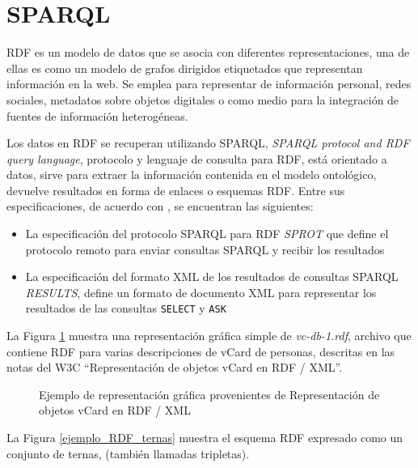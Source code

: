 \section{SPARQL}

RDF es un modelo de datos que se asocia con diferentes representaciones, una de ellas es como un modelo de grafos dirigidos etiquetados que representan informaci\'on en la web. Se emplea para representar de informaci\'on personal, redes sociales, metadatos sobre objetos digitales o como medio para la integraci\'on de fuentes de informaci\'on heterog\'eneas.

Los datos en RDF se recuperan utilizando SPARQL, \textit{SPARQL protocol and RDF query language}, protocolo y lenguaje de consulta para RDF, est\'a orientado a datos, sirve para extraer la informaci\'on contenida en el modelo ontol\'ogico, devuelve resultados en forma de enlaces o esquemas RDF. Entre sus especificaciones, de acuerdo con \cite{Skos_Sparql}, se encuentran las siguientes:

\begin{itemize}
    \item La especificaci\'on del protocolo SPARQL para RDF \textit{SPROT} que define el protocolo remoto para enviar consultas SPARQL y recibir los resultados
    \item La especificaci\'on del formato XML de los resultados de consultas SPARQL \textit{RESULTS}, define un formato de documento XML para representar los resultados de las consultas \texttt{SELECT} y \texttt{ASK} 
\end{itemize}

La Figura \ref{ejemplo_RDF_grafico} muestra una representaci\'on gr\'afica simple de \textit{vc-db-1.rdf}, archivo que contiene RDF para varias descripciones de vCard de personas, descritas en las notas del W3C ``Representaci\'on de objetos vCard en RDF / XML''.\newline

\begin{figure}[!ht]
    \centering
    \caption{Ejemplo de representaci\'on gr\'afica provenientes de Representaci\'on de objetos vCard en RDF / XML} %
    \label{ejemplo_RDF_grafico}
\end{figure}

La Figura \ref{ejemplo_RDF_ternas} muestra el esquema RDF expresado como un conjunto de ternas, (tambi\'en llamadas tripletas).\newline

